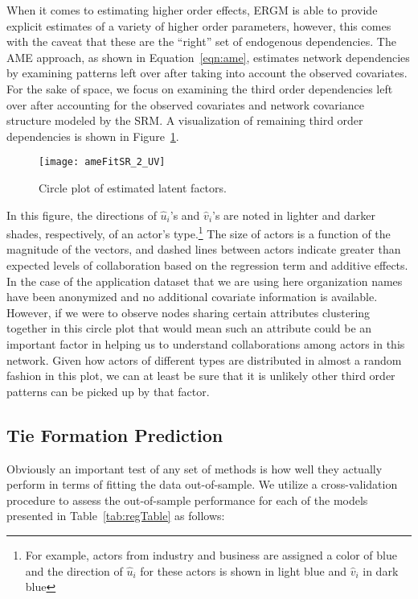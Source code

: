 When it comes to estimating higher order effects, ERGM is able to provide explicit estimates of a variety of higher order parameters, however, this comes with the caveat that these are the ``right'' set of endogenous dependencies. The AME approach, as shown in Equation~\ref{eqn:ame}, estimates network dependencies by examining patterns left over after taking into account the observed covariates. For the sake of space, we focus on examining the third order dependencies left over after accounting for the observed covariates and network covariance structure modeled by the SRM. A visualization of remaining third order dependencies is shown in Figure~\ref{fig:uv}. 

\begin{figure}[ht]
\centering
	\texttt{[image: ameFitSR\_2\_UV]}
	\caption{Circle plot of estimated latent factors.}
	\label{fig:uv}
\end{figure}
\FloatBarrier

In this figure, the directions of $\hat{u}_{i}$'s and $\hat{v}_{i}$'s are noted in lighter and darker shades, respectively, of an actor's type.\footnote{For example, actors from industry and business are assigned a color of blue and the direction of $\hat{u}_{i}$ for these actors is shown in light blue and $\hat{v}_{i}$ in dark blue} The size of actors is a function of the magnitude of the vectors, and dashed lines between actors indicate greater than expected levels of collaboration based on the regression term and additive effects. In the case of the application dataset that we are using here organization names have been anonymized and no additional covariate information is available. However, if we were to observe nodes sharing certain attributes clustering together in this circle plot that would mean such an attribute could be an important factor in helping us to understand collaborations among actors in this network. Given how actors of different types are distributed in almost a random fashion in this plot, we can at least be sure that it is unlikely other third order patterns can be picked up by that factor.

\subsection{Tie Formation Prediction}

Obviously an important test of any set of methods is how well they actually perform in terms of fitting the data out-of-sample. We utilize a cross-validation procedure to assess the out-of-sample performance for each of the models presented in Table~\ref{tab:regTable} as follows:

